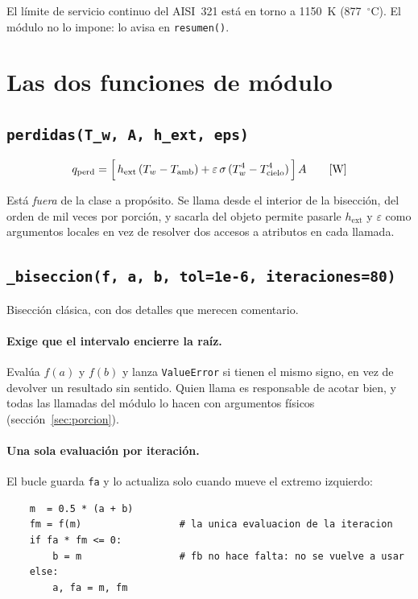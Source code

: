 \documentclass[11pt,a4paper]{article}
\begin{document}
El límite de servicio continuo del AISI~321 está en torno a 1150~K
(877~$^\circ$C). El módulo no lo impone: lo avisa en \texttt{resumen()}.

\section{Las dos funciones de módulo}

\subsection{\texttt{perdidas(T\_w, A, h\_ext, eps)}}

\[
  q_{\mathrm{perd}} = \Bigl[\,h_{\mathrm{ext}}\,(T_w - T_{\mathrm{amb}})
    + \varepsilon\,\sigma\,(T_w^4 - T_{\mathrm{cielo}}^4)\,\Bigr]\,A
  \qquad [\mathrm{W}]
\]

Está \emph{fuera} de la clase a propósito. Se llama desde el interior de la
bisección, del orden de mil veces por porción, y sacarla del objeto permite
pasarle $h_{\mathrm{ext}}$ y $\varepsilon$ como argumentos locales en vez de
resolver dos accesos a atributos en cada llamada.

\subsection{\texttt{\_biseccion(f, a, b, tol=1e-6, iteraciones=80)}}

Bisección clásica, con dos detalles que merecen comentario.

\paragraph{Exige que el intervalo encierre la raíz.} Evalúa $f(a)$ y $f(b)$ y
lanza \texttt{ValueError} si tienen el mismo signo, en vez de devolver un
resultado sin sentido. Quien llama es responsable de acotar bien, y todas las
llamadas del módulo lo hacen con argumentos físicos (sección~\ref{sec:porcion}).

\paragraph{Una sola evaluación por iteración.} El bucle guarda \texttt{fa} y lo
actualiza solo cuando mueve el extremo izquierdo:

\begin{verbatim}
    m  = 0.5 * (a + b)
    fm = f(m)                 # la unica evaluacion de la iteracion
    if fa * fm <= 0:
        b = m                 # fb no hace falta: no se vuelve a usar
    else:
        a, fa = m, fm
\end{verbatim}
\end{document}
